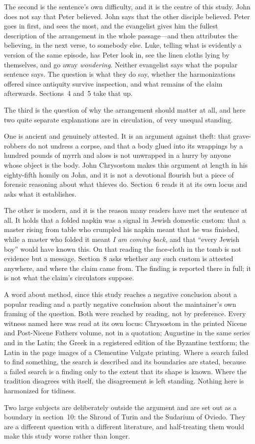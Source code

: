 The second is the sentence's own difficulty, and it is the centre of this
study. John does not say that Peter believed. John says that the other
disciple believed. Peter goes in first, and sees the most, and the evangelist
gives him the fullest description of the arrangement in the whole
passage---and then attributes the believing, in the next verse, to somebody
else. Luke, telling what is evidently a version of the same episode, has Peter
look in, see the linen cloths lying by themselves, and go away
\emph{wondering}. Neither evangelist says what the popular sentence says. The
question is what they do say, whether the harmonizations offered since
antiquity survive inspection, and what remains of the claim afterwards.
Sections~4 and~5 take that up.

The third is the question of why the arrangement should matter at all, and
here two quite separate explanations are in circulation, of very unequal
standing.

One is ancient and genuinely attested. It is an argument against theft: that
grave-robbers do not undress a corpse, and that a body glued into its
wrappings by a hundred pounds of myrrh and aloes is not unwrapped in a hurry by
anyone whose object is the body. John Chrysostom makes this argument at length
in his eighty-fifth homily on John, and it is not a devotional flourish but a
piece of forensic reasoning about what thieves do. Section~6 reads it at its
own locus and asks what it establishes.

The other is modern, and it is the reason many readers have met the sentence at
all. It holds that a folded napkin was a signal in Jewish domestic custom: that
a master rising from table who crumpled his napkin meant that he was finished,
while a master who folded it meant \emph{I am coming back}, and that ``every
Jewish boy'' would have known this. On that reading the face-cloth in the tomb
is not evidence but a message. Section~8 asks whether any such custom is
attested anywhere, and where the claim came from. The finding is reported
there in full; it is not what the claim's circulators suppose.

A word about method, since this study reaches a negative conclusion about a
popular reading and a partly negative conclusion about the maintainer's own
framing of the question. Both were reached by reading, not by preference. Every
witness named here was read at its own locus: Chrysostom in the printed
Nicene and Post-Nicene Fathers volume, not in a quotation; Augustine in the
same series and in the Latin; the Greek in a registered edition of the
Byzantine textform; the Latin in the page images of a Clementine Vulgate
printing. Where a search failed to find something, the search is described and
its boundaries are stated, because a failed search is a finding only to the
extent that its shape is known. Where the tradition disagrees with itself, the
disagreement is left standing. Nothing here is harmonized for tidiness.

Two large subjects are deliberately outside the argument and are set out as a
boundary in section~10: the Shroud of Turin and the Sudarium of Oviedo. They
are a different question with a different literature, and half-treating them
would make this study worse rather than longer.
